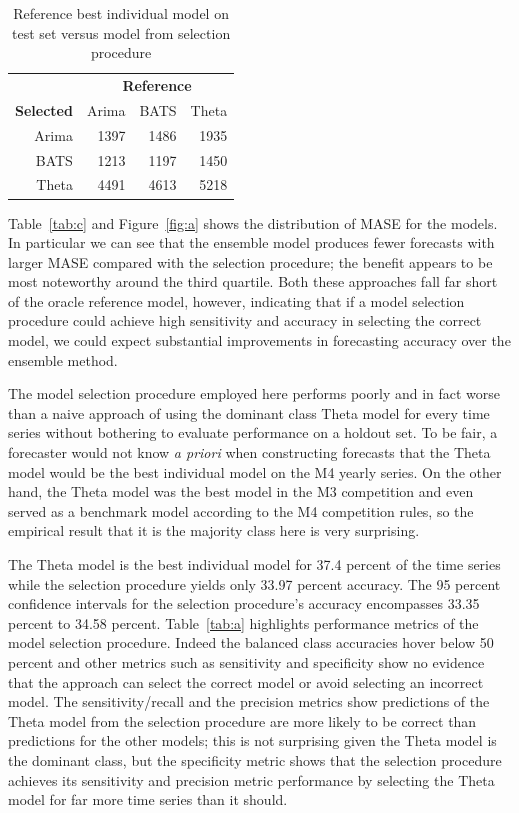 \documentclass[11pt,3p,review,authoryear]{elsarticle}
\begin{document}
\begin{table}[ht]
\centering
\begin{tabular}{rrrr}
  \hline
  & \multicolumn{3}{c}{\textbf{Reference}} \\
 \textbf{Selected} & Arima & BATS & Theta  \\
 \hline
 Arima & 1397 & 1486 & 1935 \\ 
   BATS & 1213 & 1197 & 1450 \\ 
  Theta & 4491 & 4613 & 5218 \\ 
   \hline
\end{tabular}
\caption{Reference best individual model on test set versus model from selection procedure}\label{tab:b}
\end{table}

Table~\ref{tab:c} and Figure~\ref{fig:a} shows the distribution of MASE for the models. In particular we can see that the ensemble model produces fewer forecasts with larger MASE compared with the selection procedure; the benefit appears to be most noteworthy around the third quartile. Both these approaches fall far short of the oracle reference model, however, indicating that if a model selection procedure could achieve high sensitivity and accuracy in selecting the correct model, we could expect substantial improvements in forecasting accuracy over the ensemble method. 


The model selection procedure employed here performs poorly and in fact worse than a naive approach of using the dominant class Theta model for every time series without bothering to evaluate performance on a holdout set. To be fair, a forecaster would not know \textit{a priori} when constructing forecasts that the Theta model would be the best individual model on the M4 yearly series. On the other hand, the Theta model was the best model in the M3 competition and even served as a benchmark model according to the M4 competition rules, so the empirical result that it is the majority class here is very surprising.

The Theta model is the best individual model for 37.4 percent of the time series while the selection procedure yields only 33.97 percent accuracy. The 95 percent confidence intervals for the selection procedure's accuracy encompasses 33.35 percent to 34.58 percent. Table~\ref{tab:a} highlights performance metrics of the model selection procedure. Indeed the balanced class accuracies hover below 50 percent and other metrics such as sensitivity and specificity show no evidence that the approach can select the correct model or avoid selecting an incorrect model. The sensitivity/recall and the precision metrics show predictions of the Theta model from the selection procedure are more likely to be correct than predictions for the other models; this is not surprising given the Theta model is the dominant class, but the specificity metric shows that the selection procedure achieves its sensitivity and precision metric performance by selecting the Theta model for far more time series than it should.
\end{document}
